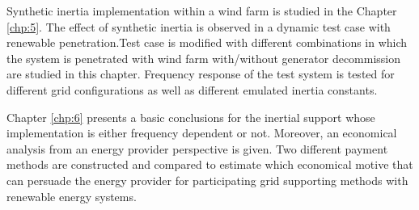 Synthetic inertia implementation within a wind farm is studied in the Chapter \ref{chp:5}. The effect of synthetic inertia is observed in a dynamic test case with renewable penetration.Test case is modified with different combinations in which the system is penetrated with wind farm with/without generator decommission are studied in this chapter. Frequency response of the test system is tested for different grid configurations as well as different emulated inertia constants.\par
Chapter \ref{chp:6} presents a basic conclusions for the inertial support whose implementation is either frequency dependent or not. Moreover, an economical analysis from an energy provider perspective is given. Two different payment methods are constructed and compared to estimate which economical motive that can persuade the energy provider for participating grid supporting methods with renewable energy systems.  


















